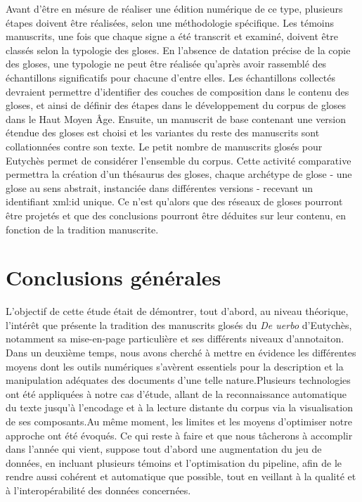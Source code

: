 \documentclass[a4paper, twoside, 12pt]{book}
\begin{document}
Avant d'être en mésure de réaliser une édition numérique de ce type, plusieurs étapes doivent être réalisées, selon une méthodologie spécifique. Les témoins manuscrits, une fois que chaque signe a été transcrit et examiné, doivent être classés selon la typologie des gloses. En l'absence de datation précise de la copie des gloses, une typologie ne peut être réalisée qu'après avoir rassemblé des échantillons significatifs pour chacune d'entre elles. Les échantillons collectés devraient permettre d'identifier des couches de composition dans le contenu des gloses, et ainsi de définir des étapes dans le développement du corpus de gloses dans le Haut Moyen Âge. Ensuite, un manuscrit de base contenant une version étendue des gloses est choisi et les variantes du reste des manuscrits sont collationnées contre son texte. Le petit nombre de manuscrits glosés pour Eutychès permet de considérer l'ensemble du corpus.  Cette activité comparative permettra la création d'un thésaurus des gloses, chaque \og{}archétype\fg{} de glose - une glose au sens abstrait, instanciée dans différentes versions - recevant un identifiant xml:id unique. Ce n'est qu'alors que des réseaux de gloses pourront être projetés et que des conclusions pourront être déduites sur leur contenu, en fonction de la tradition manuscrite. 


\section{Conclusions générales}

L'objectif de cette étude était de démontrer, tout d'abord, au niveau théorique, l'intérêt que présente la tradition des manuscrits glosés du \textit{De uerbo} d'Eutychès, notamment sa mise-en-page particulière et ses différents niveaux d'annotaiton. Dans un deuxième temps, nous avons cherché à mettre en évidence les différentes moyens dont les outils numériques s'avèrent essentiels pour la description et la manipulation adéquates des documents d'une telle nature.Plusieurs technologies ont été appliquées à notre cas d'étude, allant de la reconnaissance automatique du texte jusqu'à l'encodage et à la lecture distante du corpus via la visualisation de ses composants.Au même moment, les limites et les moyens d'optimiser notre approche ont été évoqués. Ce qui reste à faire et que nous tâcherons à accomplir dans l'année qui vient, suppose tout d'abord une augmentation du jeu de données, en incluant plusieurs témoins et l'optimisation du pipeline, afin de le rendre aussi cohérent et automatique que possible, tout en veillant à la qualité et à l'interopérabilité des données concernées.


\newpage
\nocite{*}
\printbibliography

\listoffigures
\end{document}
